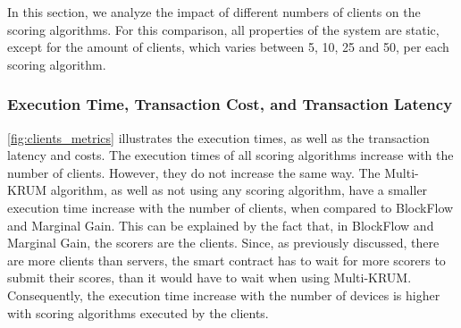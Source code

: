 In this section, we analyze the impact of different numbers of clients on the scoring algorithms. For this comparison, all properties of the system are static, except for the amount of clients, which varies between 5, 10, 25 and 50, per each scoring algorithm.

\subsubsection{Execution Time, Transaction Cost, and Transaction Latency}

\autoref{fig:clients_metrics} illustrates the execution times, as well as the transaction latency and costs. The execution times of all scoring algorithms increase with the number of clients. However, they do not increase the same way. The Multi-KRUM algorithm, as well as not using any scoring algorithm, have a smaller execution time increase with the number of clients, when compared to BlockFlow and Marginal Gain. This can be explained by the fact that, in BlockFlow and Marginal Gain, the scorers are the clients. Since, as previously discussed, there are more clients than servers, the smart contract has to wait for more scorers to submit their scores, than it would have to wait when using Multi-KRUM. Consequently, the execution time increase with the number of devices is higher with scoring algorithms executed by the clients.

